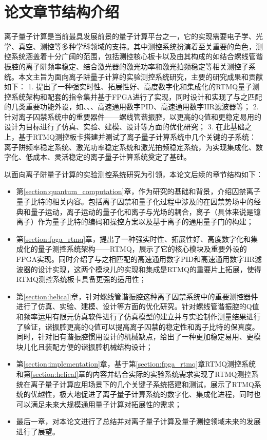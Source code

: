 \section[论文章节结构介绍]{论文章节结构介绍}
离子量子计算是当前最具发展前景的量子计算平台之一，它的实现需要电子学、光学、真空、测控等多种学科领域的支持。其中测控系统扮演着至关重要的角色，测控系统涵盖着十分广阔的范围，包括测控核心板卡以及由其构成的如结合螺线管谐振腔的离子阱频率稳定、结合激光器的激光功率和激光拍频稳定等相关测控子系统。本文主旨为面向离子阱量子计算的实验测控系统研究，主要的研究成果和贡献如下：
1. 提出了一种强实时性、拓展性好、高度数字化和集成化的RTMQ量子测控系统架构和配套的指令集并基于FPGA进行了实现，同时设计和实现了与之匹配的几类重要功能外设，如、、、高速通用数字PID、高速通用数字IIR滤波器等；
2. 针对离子囚禁系统中的重要器件——螺线管谐振腔，以更高的Q值和更稳定易用的设计为目标进行了仿真、实验、建模、设计等方面的优化研究；
3. 在此基础之上，基于RTMQ测控板卡搭建并测试了离子量子计算系统中几个关键的子系统：离子阱频率稳定系统、激光功率稳定系统和激光拍频稳定系统，为实现集成化、数字化、低成本、灵活稳定的离子量子计算系统奠定了基础。

以面向离子阱量子计算的实验测控系统研究为引领，本论文后续的章节结构如下：
\begin{itemize}
    \item 第\ref{section:quantum_computation}章，作为研究的基础和背景，介绍囚禁离子量子比特的相关内容。包括离子囚禁和量子化过程中涉及的在囚禁势场中的经典和量子运动，离子运动的量子化和离子与光场的耦合，离子（具体来说是镱离子）作为量子比特的编码和操控方案以及基于离子的通用量子门的构建；
    \item 第\ref{section:fpga_rtmq}章，提出了一种强实时性、拓展性好、高度数字化和集成化的量子测控系统架构——RTMQ，展示了它的核心模块及重要外设的FPGA实现。同时介绍了与之相匹配的高速通用数字PID和高速通用数字IIR滤波器的设计实现，这两个模块儿的实现和集成是RTMQ的重要片上拓展，使得RTMQ测控系统板卡具备更强的适用性；
    \item 第\ref{section:helical}章，针对螺线管谐振腔这种离子囚禁系统中的重要测控器件进行了仿真、实验、建模、设计等方面的优化研究。针对螺线管谐振腔的Q值和频率运用有限元仿真软件进行了仿真模型的建立并与实验制作测量结果进行了验证，谐振腔更高的Q值可以提高离子囚禁的稳定性和离子比特的保真度。同时，针对旧有谐振腔惯用设计的机械缺点，给出了一种更加稳定易用、更模块儿化且装配方便的谐振腔机械结构设计；
    \item 第\ref{section:implementation}章，基于第\ref{section:fpga_rtmq}章RTMQ测控系统和第\ref{section:helical}章的内容并结合实际的实验系统需求实现了RTMQ测控系统在离子量子计算应用场景下的几个关键子系统搭建和测试，展示了RTMQ系统的优越性，极大地促进了离子量子计算系统的数字化、集成化进程，同时也可以满足未来大规模通用量子计算对拓展性的需求；
    \item 最后一章，对本论文进行了总结并对离子量子计算及量子测控领域未来的发展进行了展望。
\end{itemize}